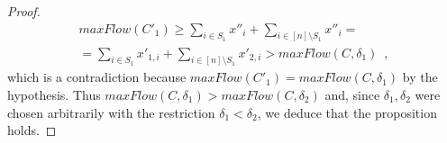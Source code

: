 \begin{proof}
\begin{equation*}
\begin{gathered}
    maxFlow\left(C'_1\right) \geq \sum\limits_{i \in S_1}x''_i + \sum\limits_{i \in [n] \setminus S_1}x''_i = \\
    = \sum\limits_{i \in S_1}x'_{1, i} + \sum\limits_{i \in [n] \setminus S_1}x'_{2, i} > maxFlow(C, \delta_1) \enspace,
  \end{gathered}
  \end{equation*}
  which is a contradiction because $maxFlow\left(C'_1\right) = maxFlow\left(C, \delta_1\right)$ by the hypothesis. Thus
  $maxFlow\left(C, \delta_1\right) > maxFlow\left(C, \delta_2\right)$ and, since $\delta_1, \delta_2$ were chosen
  arbitrarily with the restriction $\delta_1 < \delta_2$, we deduce that the proposition holds.
\end{proof}
